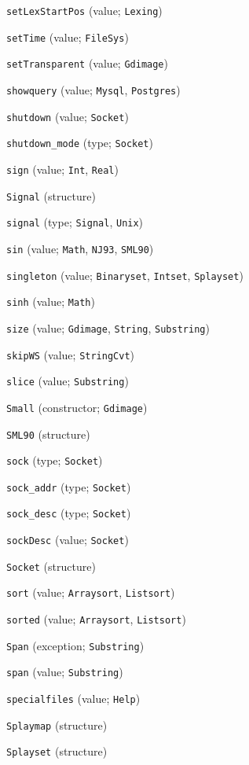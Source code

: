 \begin{description}
\item[] \verb"setLexStartPos" (value; \verb"Lexing")
\item[] \verb"setTime" (value; \verb"FileSys")
\item[] \verb"setTransparent" (value; \verb"Gdimage")
\item[] \verb"showquery" (value; \verb"Mysql", \verb"Postgres")
\item[] \verb"shutdown" (value; \verb"Socket")
\item[] \verb"shutdown_mode" (type; \verb"Socket")
\item[] \verb"sign" (value; \verb"Int", \verb"Real")
\item[] \verb"Signal" (structure)
\item[] \verb"signal" (type; \verb"Signal", \verb"Unix")
\item[] \verb"sin" (value; \verb"Math", \verb"NJ93", \verb"SML90")
\item[] \verb"singleton" (value; \verb"Binaryset", \verb"Intset", \verb"Splayset")
\item[] \verb"sinh" (value; \verb"Math")
\item[] \verb"size" (value; \verb"Gdimage", \verb"String", \verb"Substring")
\item[] \verb"skipWS" (value; \verb"StringCvt")
\item[] \verb"slice" (value; \verb"Substring")
\item[] \verb"Small" (constructor; \verb"Gdimage")
\item[] \verb"SML90" (structure)
\item[] \verb"sock" (type; \verb"Socket")
\item[] \verb"sock_addr" (type; \verb"Socket")
\item[] \verb"sock_desc" (type; \verb"Socket")
\item[] \verb"sockDesc" (value; \verb"Socket")
\item[] \verb"Socket" (structure)
\item[] \verb"sort" (value; \verb"Arraysort", \verb"Listsort")
\item[] \verb"sorted" (value; \verb"Arraysort", \verb"Listsort")
\item[] \verb"Span" (exception; \verb"Substring")
\item[] \verb"span" (value; \verb"Substring")
\item[] \verb"specialfiles" (value; \verb"Help")
\item[] \verb"Splaymap" (structure)
\item[] \verb"Splayset" (structure)

\end{description}
